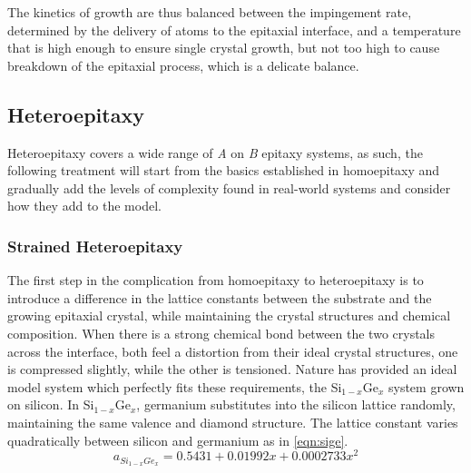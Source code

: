 The kinetics of growth are thus balanced between the impingement rate, determined by the delivery of atoms to the epitaxial interface, and a temperature that is high enough to ensure single crystal growth, but not too high to cause breakdown of the epitaxial process, which is a delicate balance.

\subsection{Heteroepitaxy} 
Heteroepitaxy covers a wide range of \emph{A} on \emph{B} epitaxy systems, as such, the following treatment will start from the basics established in homoepitaxy and gradually add the levels of complexity found in real-world systems and consider how they add to the model.

\subsubsection{Strained Heteroepitaxy} The first step in the complication from homoepitaxy to heteroepitaxy is to introduce a difference in the lattice constants between the substrate and the growing epitaxial crystal, while maintaining the crystal structures and chemical composition.
When there is a strong chemical bond between the two crystals across the interface, both feel a distortion from their ideal crystal structures, one is compressed slightly, while the other is tensioned\cite{Dunstan1997}.
Nature has provided an ideal model system which perfectly fits these requirements, the Si\(_{1-x}\)Ge\(_x\) system grown on silicon\cite{Paul2004}.
In Si\(_{1-x}\)Ge\(_x\), germanium substitutes into the silicon lattice randomly, maintaining the same valence and diamond structure.
The lattice constant varies quadratically between silicon and germanium as in \cref{eqn:sige}.
\begin{equation}
 a_{Si_{1-x}Ge_x} = 0.5431 + 0.01992x + 0.0002733x^2 \label{eqn:sige}
\end{equation}

